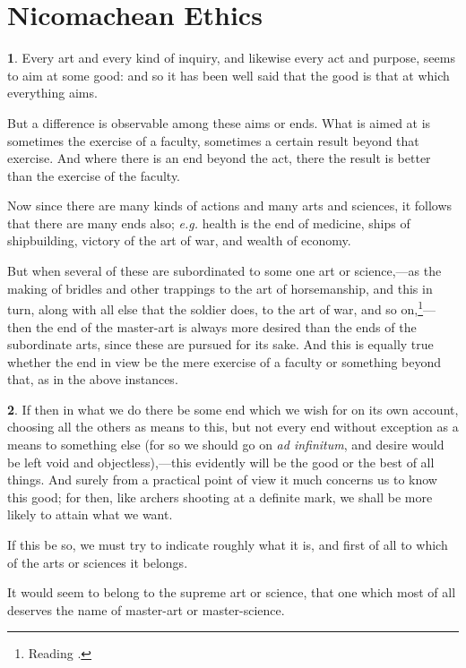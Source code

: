 
\author{Aristotle}
\chapter[Nicomachean Ethics, bk. 1, chaps. 1--7]{Nicomachean Ethics}

\textbf{1}. Every art and every kind of inquiry, and likewise
every act and purpose, seems to aim at some good: and so it has been
well said that the good is that at which everything aims.

But a difference is observable among these aims or ends. What is aimed
at is sometimes the exercise of a faculty, sometimes a certain result
beyond that exercise. And where there is an end beyond the act, there
the result is better than the exercise of the faculty.

Now since there are many kinds of actions and many arts and sciences,
it follows that there are many ends also; \textit{e.g.} health is the
end of medicine, ships of shipbuilding, victory of the art of war, and
wealth of economy.

But when several of these are subordinated to  some one art or
science,---as the making of bridles and other trappings to the art of
horsemanship, and this in turn, along with all else that the soldier
does, to the art of war, and so on,\footnote{Reading .}---then the end of the master-art is always more desired than the
ends of the subordinate arts, since these are pursued for its sake.
And this is equally true whether the end in view be the mere exercise
of a faculty or something beyond that, as in the above instances.

\textbf{2}. If then in what we do there be some end which we wish for
on its own account, choosing all the others as means to this, but not
every end without exception as a means to something else (for so we
should go on \textit{ad infinitum}, and desire would be left void and
objectless),---this evidently will be the good or the best of all
things. And surely from a practical point of view it much concerns us
to know this good; for then, like archers shooting at a definite mark,
we shall be more likely to attain what we want.

If this be so, we must try to indicate roughly what it is, and first
of all to which of the arts or sciences it belongs.

It would seem to belong to the supreme art or science, that one which
most of all deserves the name of master-art or master-science.

